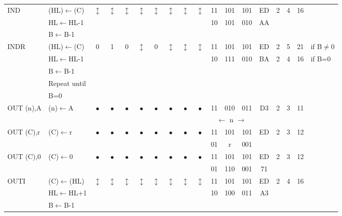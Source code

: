 \documentclass[oneside,a4paper]{book}
\begin{document}
{\begin{tabular}{llc@{ }c@{ }c@{ }c@{ }c@{ }c@{ }c@{ }cc@{ }c@{ }cccccll}
IND & (HL)$\leftarrow$(C) & 
	$\updownarrow$\footnotemark[1] & $\updownarrow$\footnotemark[1] & $\updownarrow$\footnotemark[1] & $\updownarrow$\footnotemark[3] & 
	$\updownarrow$\footnotemark[1] & $\updownarrow$\footnotemark[3] & $\updownarrow$\footnotemark[2] & $\updownarrow$\footnotemark[4] & 11 & 101 & 101 
	& ED & 2 & 4 & 16 & & \\
	& HL$\leftarrow$HL-1 & \multicolumn{8}{c}{} & 10 & 101 & 010 & AA & & &  & & \\
	& B$\leftarrow$B-1 \\

INDR & (HL)$\leftarrow$(C) & 
	0 & 1 & 0 & $\updownarrow$\footnotemark[3] & 0 & $\updownarrow$\footnotemark[3] & $\updownarrow$\footnotemark[2] & $\updownarrow$\footnotemark[3] & 11 & 101 & 101 
	& ED & 2 & 5 & 21 & \multicolumn{2}{l}{if B$\not=$0} \\
	& HL$\leftarrow$HL-1 & \multicolumn{8}{c}{} & 10 & 111 & 010 & BA & 2 & 4 & 16 & \multicolumn{2}{l}{if B=0} \\
	& B$\leftarrow$B-1 \\
	& Repeat until \\
	& B=0 \\

OUT (n),A & (n)$\leftarrow$A &
	$\bullet$ & $\bullet$ & $\bullet$ & $\bullet$ & $\bullet$ & $\bullet$ & $\bullet$ & $\bullet$ & 11 & 010 & 011 
	& D3 & 2 & 3 & 11 & & \\
	& &  \multicolumn{8}{c}{} & \multicolumn{3}{c}{$\leftarrow$ n $\rightarrow$} & & & &  & & \\

OUT (C),r & (C)$\leftarrow$r &
	$\bullet$ & $\bullet$ & $\bullet$ & $\bullet$ & $\bullet$ & $\bullet$ & $\bullet$ & $\bullet$ & 11 & 101 & 101
	& ED & 2 & 3 & 12 & & \\
	& &  \multicolumn{8}{c}{} & 01 & r & 001  & & & &  & & \\

OUT (C),0 & (C)$\leftarrow$0 &
	$\bullet$ & $\bullet$ & $\bullet$ & $\bullet$ & $\bullet$ & $\bullet$ & $\bullet$ & $\bullet$ & 11 & 101 & 101
	& ED & 2 & 3 & 12 & & \\
	& &  \multicolumn{8}{c}{} & 01 & 110 & 001 & 71 & & &  & & \\

OUTI & (C)$\leftarrow$(HL) & 
	$\updownarrow$\footnotemark[1] & $\updownarrow$\footnotemark[1] & $\updownarrow$\footnotemark[1] & $\updownarrow$\footnotemark[3] & 
	$\updownarrow$\footnotemark[1] & $\updownarrow$\footnotemark[3] & $\updownarrow$\footnotemark[2] & $\updownarrow$\footnotemark[3] & 11 & 101 & 101 
	& ED & 2 & 4 & 16 & & \\
	& HL$\leftarrow$HL+1 & \multicolumn{8}{c}{} & 10 & 100 & 011 & A3 & & &  & & \\
	& B$\leftarrow$B-1 \\


\end{tabular}}
\end{document}

